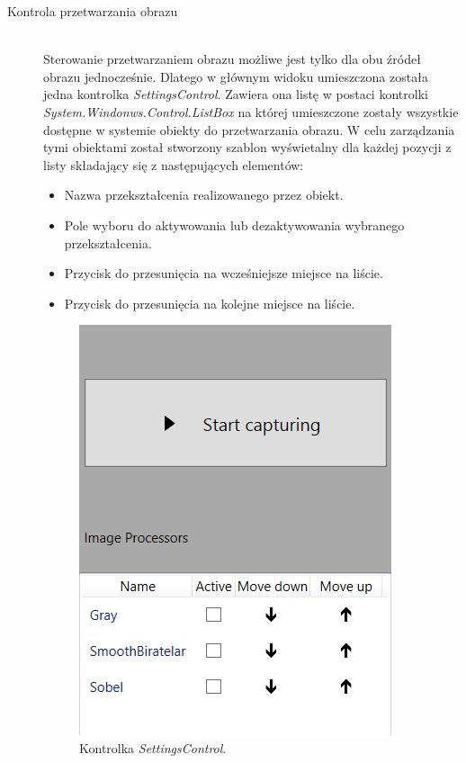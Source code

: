 \documentclass[a4paper,11pt,twoside]{report}
\theoremstyle{definition}
\begin{document}
\begin{description}
\pagebreak
\item [Kontrola przetwarzania obrazu] \hfill \\
Sterowanie przetwarzaniem obrazu możliwe jest tylko dla obu źródeł obrazu jednocześnie. Dlatego w głównym widoku umieszczona została jedna kontrolka \textit{SettingsControl}. Zawiera ona listę w postaci kontrolki \textit{System.Windonws.Control.ListBox} na której umieszczone zostały wszystkie dostępne w systemie obiekty do przetwarzania obrazu. W celu zarządzania tymi obiektami został stworzony szablon wyświetalny dla każdej pozycji z listy składający się z następujących elementów:

\begin{itemize}
\item Nazwa przekształcenia realizowanego przez obiekt.
\item Pole wyboru do aktywowania lub dezaktywowania wybranego przekształcenia.
\item Przycisk do przesunięcia na wcześniejsze miejsce na liście.
\item Przycisk do przesunięcia na kolejne miejsce na liście.
\end{itemize}

\begin{figure}[h]
\centering
\includegraphics[scale=0.5]{images/settingscontrol_screen}
\caption[Widok aplikacji]{Kontrolka \textit{SettingsControl}.}
\end{figure}


\end{description}
\end{document}

